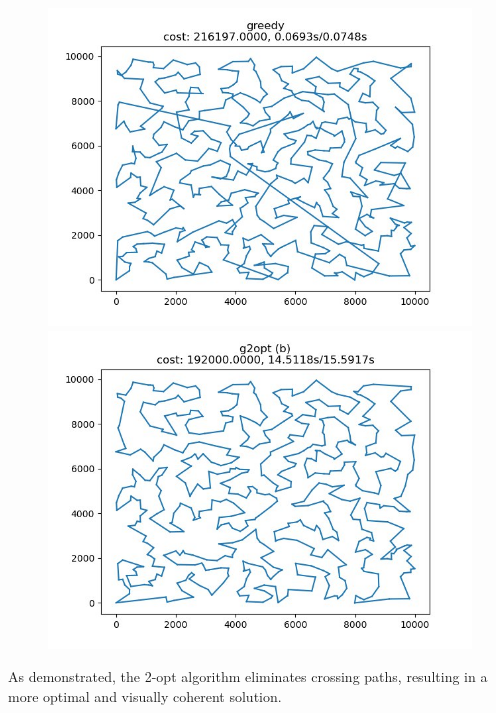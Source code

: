 \begin{figure}[h]
    \centering
    \includegraphics*[width=.45\textwidth]{../code/solutions/1_600_greedy.jpg}
    \includegraphics*[width=.45\textwidth]{../code/solutions/1_600_g2opt.jpg}
\end{figure}

As demonstrated, the 2-opt algorithm eliminates crossing paths, resulting in a more optimal and visually coherent solution.